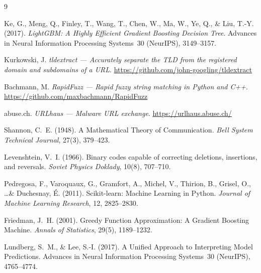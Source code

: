 \documentclass[a4paper,12pt]{article}
\begin{document}
\newpage
\begin{thebibliography}{9}

Ke, G., Meng, Q., Finley, T., Wang, T., Chen, W., Ma, W., Ye, Q., \& Liu, T.-Y. (2017).
\textit{LightGBM: A Highly Efficient Gradient Boosting Decision Tree}.
Advances in Neural Information Processing Systems~30 (NeurIPS), 3149--3157.

Kurkowski, J.
\textit{tldextract --- Accurately separate the TLD from the registered domain and subdomains of a URL}.
\url{https://github.com/john-googling/tldextract}

Bachmann, M.
\textit{RapidFuzz --- Rapid fuzzy string matching in Python and C++}.
\url{https://github.com/maxbachmann/RapidFuzz}

abuse.ch.
\textit{URLhaus --- Malware URL exchange}.
\url{https://urlhaus.abuse.ch/}

Shannon, C.~E. (1948).
A Mathematical Theory of Communication.
\textit{Bell System Technical Journal}, 27(3), 379--423.

Levenshtein, V.~I. (1966).
Binary codes capable of correcting deletions, insertions, and reversals.
\textit{Soviet Physics Doklady}, 10(8), 707--710.

Pedregosa, F., Varoquaux, G., Gramfort, A., Michel, V., Thirion, B., Grisel, O., \ldots \& Duchesnay, \'E. (2011).
Scikit-learn: Machine Learning in Python.
\textit{Journal of Machine Learning Research}, 12, 2825--2830.

Friedman, J.~H. (2001).
Greedy Function Approximation: A Gradient Boosting Machine.
\textit{Annals of Statistics}, 29(5), 1189--1232.

Lundberg, S.~M., \& Lee, S.-I. (2017).
A Unified Approach to Interpreting Model Predictions.
Advances in Neural Information Processing Systems~30 (NeurIPS), 4765--4774.

\end{thebibliography}
\end{document}
